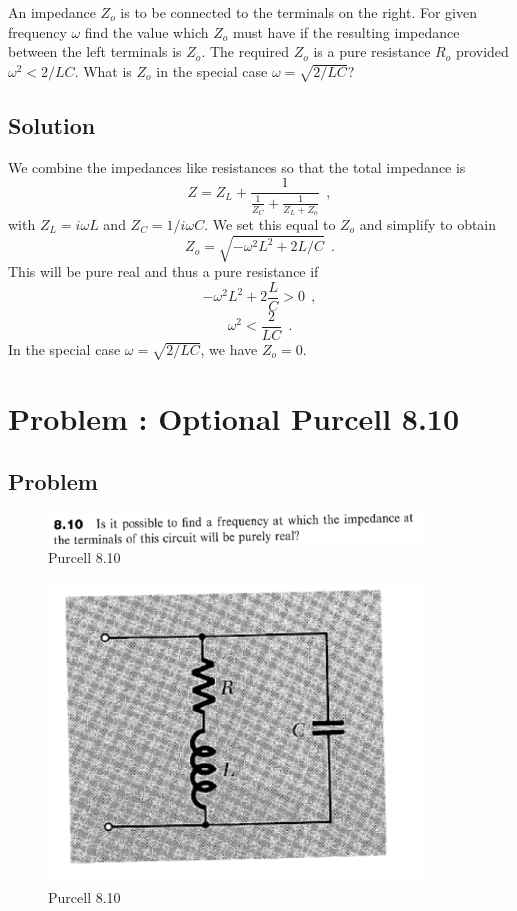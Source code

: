 \documentclass[solutions]{esg8022pset}
\begin{document}
An impedance $Z_o$ is to be connected to the terminals on the right. For given frequency $\omega$ find the value which $Z_o$ must have if the resulting impedance between the left terminals is $Z_o$. The required $Z_o$ is a pure resistance $R_o$ provided $\omega^2<2/LC$. What is $Z_o$ in the special case $\omega = \sqrt{2/LC}$?


\subsection{Solution}
We combine the impedances like resistances so that the total impedance is
\[ Z = Z_L + \frac{1}{\frac{1}{Z_C} + \frac{1}{Z_L + Z_o}}\ \ , \]
with $Z_L = i\omega L$ and $Z_C = 1/i\omega C$. We set this equal to $Z_o$ and simplify to obtain
\[ Z_o = \sqrt{-\omega^2L^2 + 2L/C}\ \ .\]
This will be pure real and thus a pure resistance if
\[ -\omega^2L^2 + 2\frac{L}{C} >0 \ \ ,\]
\[ \omega^2 < \frac{2}{LC}\ \ .\]
In the special case $\omega = \sqrt{2/LC}$, we have $Z_o=0$.
\section{Problem \thesection: Optional Purcell 8.10}
\subsection{Problem}
\begin{figure}[H]
    \centering
    \includegraphics[width = 10cm]{pu810}
    \caption{Purcell 8.10}
  \end{figure}

  \begin{figure}[H]
    \centering
    \includegraphics[width = 10cm]{figpu810}
    \caption{Purcell 8.10}
  \end{figure}
\end{document}
